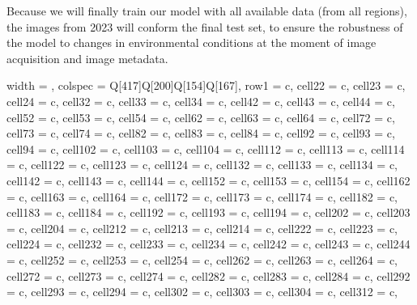 Because we will finally train our model with all available data (from all
regions), the images from 2023 will conform the final test set, to ensure the
robustness of the model to changes in environmental conditions at the moment of
image acquisition and image metadata.

\begin{longtblr}[
    caption = {Metadata of the satellite images used in the study.},
    label = {tab:metadata_satellite_images},
    ]{
    width = \linewidth,
    colspec = {Q[417]Q[200]Q[154]Q[167]},
    row{1} = {c},
    cell{2}{2} = {c},
    cell{2}{3} = {c},
    cell{2}{4} = {c},
    cell{3}{2} = {c},
    cell{3}{3} = {c},
    cell{3}{4} = {c},
    cell{4}{2} = {c},
    cell{4}{3} = {c},
    cell{4}{4} = {c},
    cell{5}{2} = {c},
    cell{5}{3} = {c},
    cell{5}{4} = {c},
    cell{6}{2} = {c},
    cell{6}{3} = {c},
    cell{6}{4} = {c},
    cell{7}{2} = {c},
    cell{7}{3} = {c},
    cell{7}{4} = {c},
    cell{8}{2} = {c},
    cell{8}{3} = {c},
    cell{8}{4} = {c},
    cell{9}{2} = {c},
    cell{9}{3} = {c},
    cell{9}{4} = {c},
    cell{10}{2} = {c},
    cell{10}{3} = {c},
    cell{10}{4} = {c},
    cell{11}{2} = {c},
    cell{11}{3} = {c},
    cell{11}{4} = {c},
    cell{12}{2} = {c},
    cell{12}{3} = {c},
    cell{12}{4} = {c},
    cell{13}{2} = {c},
    cell{13}{3} = {c},
    cell{13}{4} = {c},
    cell{14}{2} = {c},
    cell{14}{3} = {c},
    cell{14}{4} = {c},
    cell{15}{2} = {c},
    cell{15}{3} = {c},
    cell{15}{4} = {c},
    cell{16}{2} = {c},
    cell{16}{3} = {c},
    cell{16}{4} = {c},
    cell{17}{2} = {c},
    cell{17}{3} = {c},
    cell{17}{4} = {c},
    cell{18}{2} = {c},
    cell{18}{3} = {c},
    cell{18}{4} = {c},
    cell{19}{2} = {c},
    cell{19}{3} = {c},
    cell{19}{4} = {c},
    cell{20}{2} = {c},
    cell{20}{3} = {c},
    cell{20}{4} = {c},
    cell{21}{2} = {c},
    cell{21}{3} = {c},
    cell{21}{4} = {c},
    cell{22}{2} = {c},
    cell{22}{3} = {c},
    cell{22}{4} = {c},
    cell{23}{2} = {c},
    cell{23}{3} = {c},
    cell{23}{4} = {c},
    cell{24}{2} = {c},
    cell{24}{3} = {c},
    cell{24}{4} = {c},
    cell{25}{2} = {c},
    cell{25}{3} = {c},
    cell{25}{4} = {c},
    cell{26}{2} = {c},
    cell{26}{3} = {c},
    cell{26}{4} = {c},
    cell{27}{2} = {c},
    cell{27}{3} = {c},
    cell{27}{4} = {c},
    cell{28}{2} = {c},
    cell{28}{3} = {c},
    cell{28}{4} = {c},
    cell{29}{2} = {c},
    cell{29}{3} = {c},
    cell{29}{4} = {c},
    cell{30}{2} = {c},
    cell{30}{3} = {c},
    cell{30}{4} = {c},
    cell{31}{2} = {c},
}
\end{longtblr}

